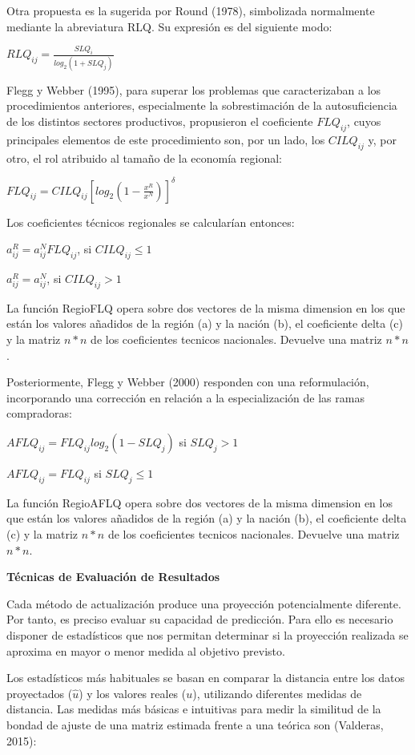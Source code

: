 \documentclass{article}
\begin{document}
Otra propuesta es la sugerida por Round (1978), simbolizada normalmente mediante la abreviatura RLQ. Su expresión es del siguiente modo:

$RLQ_{ij}=\frac{SLQ_i}{log_2(1+SLQ_j)}$


Flegg y Webber (1995), para superar los problemas que caracterizaban a los procedimientos anteriores, especialmente la sobrestimación de la autosuficiencia de los distintos sectores productivos, propusieron el coeficiente $FLQ_{ij}$, cuyos principales elementos de este procedimiento son, por un lado, los $CILQ_{ij}$ y, por otro, el rol atribuido al tamaño de la economía regional:

$FLQ_{ij}=CILQ_{ij}[log_2(1-\frac{x^R}{x^N})]^{\delta}$




Los coeficientes técnicos regionales se calcularían entonces:

$a^R_{ij}=a^N_{ij}FLQ_{ij}$, si $CILQ_{ij} \leq 1$

$a^R_{ij}=a^N_{ij}$, si $CILQ_{ij} > 1$

La función RegioFLQ opera sobre dos vectores de la misma dimension en los que están los valores añadidos de la región (a) y la nación (b), el coeficiente delta (c) y la matriz $n*n$ de los coeficientes tecnicos nacionales. Devuelve una matriz $n*n$.


Posteriormente, Flegg y Webber (2000) responden con una reformulación, incorporando una corrección en relación a la especialización de las ramas compradoras:

$AFLQ_{ij}=FLQ_{ij} log_2(1-SLQ_j)$ si $SLQ_j>1$

$AFLQ_{ij}=FLQ_{ij}$ si $SLQ_j\leq 1$

La función RegioAFLQ opera sobre dos vectores de la misma dimension en los que están los valores añadidos de la región (a) y la nación (b), el coeficiente delta (c) y la matriz $n*n$ de los coeficientes tecnicos nacionales. Devuelve una matriz $n*n$.


{\bf Técnicas de Evaluación de Resultados}


Cada método de actualización produce una proyección potencialmente diferente. Por tanto, es preciso evaluar su capacidad de predicción. Para ello es necesario disponer de estadísticos que nos permitan determinar si la proyección realizada se aproxima en mayor o menor medida al objetivo previsto.

Los estadísticos más habituales se basan en comparar la distancia entre los datos proyectados ($\hat u$) y los valores reales ($u$), utilizando  diferentes medidas de distancia. Las medidas más básicas e intuitivas para medir la similitud de la bondad de ajuste de una matriz estimada frente a una teórica son (Valderas, 2015):
\end{document}
